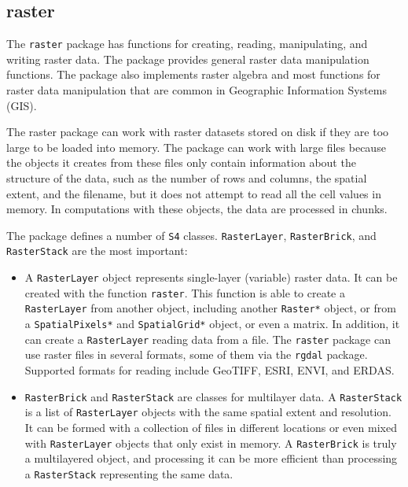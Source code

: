 \subsection{raster}
\label{sec:raster}


The \texttt{raster} package \cite{Hijmans2013} has functions for
creating, reading, manipulating, and writing raster data. The package
provides general raster data manipulation functions. The package also
implements raster algebra and most functions for raster data
manipulation that are common in Geographic Information Systems (GIS).

The raster package can work with raster datasets stored on disk if
they are too large to be loaded into memory. The package can work with
large files because the objects it creates from these files only
contain information about the structure of the data, such as the
number of rows and columns, the spatial extent, and the filename, but
it does not attempt to read all the cell values in memory. In
computations with these objects, the data are processed in chunks.

The package defines a number of \texttt{S4}
classes. \texttt{RasterLayer}, \texttt{RasterBrick}, and
\texttt{RasterStack} are the most important:
\begin{itemize}
\item A \texttt{RasterLayer} object represents single-layer (variable)
  raster data. It can be created with the function
  \texttt{raster}. This function is able to create a
  \texttt{RasterLayer} from another object, including another
  \texttt{Raster*} object, or from a \texttt{SpatialPixels*} and
  \texttt{SpatialGrid*} object, or even a matrix. In addition, it can
  create a \texttt{RasterLayer} reading data from a file. The
  \texttt{raster} package can use raster files in several formats,
  some of them via the \texttt{rgdal} package. Supported formats for
  reading include GeoTIFF, ESRI, ENVI, and ERDAS.

\item \texttt{RasterBrick} and \texttt{RasterStack} are classes for
  multilayer data. A \texttt{RasterStack} is a list of
  \texttt{RasterLayer} objects with the same spatial extent and
  resolution. It can be formed with a collection of files in different
  locations or even mixed with \texttt{RasterLayer} objects that only
  exist in memory.  A \texttt{RasterBrick} is truly a multilayered
  object, and processing it can be more efficient than processing a
  \texttt{RasterStack} representing the same data.

\end{itemize}

